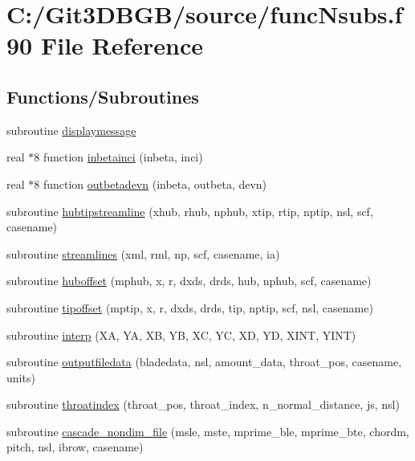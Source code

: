 \hypertarget{func_nsubs_8f90}{}\section{C\+:/\+Git3\+D\+B\+G\+B/source/func\+Nsubs.f90 File Reference}
\label{func_nsubs_8f90}
\subsection*{Functions/\+Subroutines}
\begin{DoxyCompactItemize}
\item 
subroutine \hyperlink{func_nsubs_8f90_a4a8bc1f698d94e09592f25a8bd194768}{displaymessage}
\item 
real $\ast$8 function \hyperlink{func_nsubs_8f90_a2ae2bc0834d61b30869f14490c600bf8}{inbetainci} (inbeta, inci)
\item 
real $\ast$8 function \hyperlink{func_nsubs_8f90_a56bc674499dfb930a1fcbdd96302b314}{outbetadevn} (inbeta, outbeta, devn)
\item 
subroutine \hyperlink{func_nsubs_8f90_ab0962397e03e040d57d95ffcd01c7647}{hubtipstreamline} (xhub, rhub, nphub, xtip, rtip, nptip, nsl, scf, casename)
\item 
subroutine \hyperlink{func_nsubs_8f90_af36676ddada4a392f839d5884a3f0994}{streamlines} (xml, rml, np, scf, casename, ia)
\item 
subroutine \hyperlink{func_nsubs_8f90_ac1c4ab8894f11e8e4a91c1caa86d6bde}{huboffset} (mphub, x, r, dxds, drds, hub, nphub, scf, casename)
\item 
subroutine \hyperlink{func_nsubs_8f90_a470359fa98c2e95400fba72c1ac5fcd5}{tipoffset} (mptip, x, r, dxds, drds, tip, nptip, scf, nsl, casename)
\item 
subroutine \hyperlink{func_nsubs_8f90_a93d13d26bea44378d2d6d3326ec1e4e3}{interp} (X\+A, Y\+A, X\+B, Y\+B, X\+C, Y\+C, X\+D, Y\+D, X\+I\+N\+T, Y\+I\+N\+T)
\item 
subroutine \hyperlink{func_nsubs_8f90_ac18c0448926e39757d71d4a34252e5b8}{outputfiledata} (bladedata, nsl, amount\+\_\+data, throat\+\_\+pos, casename, units)
\item 
subroutine \hyperlink{func_nsubs_8f90_a704ccaa1ae9d68875970c62c51a4880e}{throatindex} (throat\+\_\+pos, throat\+\_\+index, n\+\_\+normal\+\_\+distance, js, nsl)
\item 
subroutine \hyperlink{func_nsubs_8f90_ae04f7bd8c70f97d1b0497a335b6d278c}{cascade\+\_\+nondim\+\_\+file} (msle, mste, mprime\+\_\+ble, mprime\+\_\+bte, chordm, pitch, nsl, ibrow, casename)

\end{DoxyCompactItemize}
